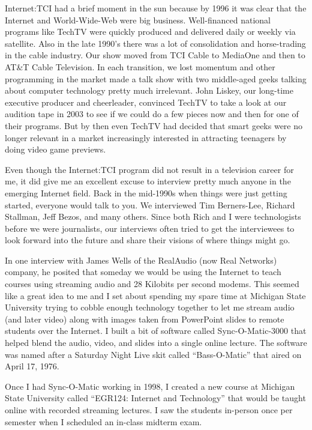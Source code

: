 \documentclass[12pt]{book}
\begin{document}
Internet:TCI had a brief moment in the sun because by 1996 it
was clear that the Internet and World-Wide-Web were big
business.  Well-financed national programs like TechTV were quickly
produced and delivered daily or weekly via satellite.  Also in the late
1990's there was a lot of consolidation and horse-trading in the cable
industry.   Our show moved from TCI Cable to MediaOne and then to
AT\&T Cable Television.  In each transition, we lost momentum
and other programming in the market made a talk show
with two middle-aged geeks talking about computer technology pretty much
irrelevant.  John Liskey, our long-time executive producer and
cheerleader, convinced TechTV to take a look at our audition
tape in 2003 to see if we could do a few pieces now and then
for one of their programs.  But by then even
TechTV had decided that smart geeks
were no longer relevant in a market increasingly interested in
attracting teenagers by doing video game previews.

Even though the Internet:TCI program did not result in a television
career for me, it did give me an excellent excuse to interview
pretty much anyone in the emerging Internet field.   Back in the mid-1990s
when things were just getting started, everyone would talk to you.
We interviewed Tim Berners-Lee, Richard Stallman, Jeff Bezos, and many
others.  Since both Rich and I were technologists before we were
journalists, our interviews often tried to get the interviewees to look
forward into the future and share their visions of where things might go.

In one interview with James Wells of the RealAudio (now Real Networks)
company, he posited that someday we would be using the Internet to
teach courses using streaming audio and 28 Kilobits per second modems.
This seemed like a great idea to me and I set about spending my spare
time at Michigan State University trying to cobble enough technology
together to let me stream audio (and later video) along with images taken
from PowerPoint slides to remote students over the Internet.  I built
a bit of software called Sync-O-Matic-3000 that helped
blend the audio, video, and slides into a single online lecture.
The software was named after a Saturday Night Live skit called
``Bass-O-Matic'' that aired on April 17, 1976.

Once I had Sync-O-Matic working in 1998, I created a new course at
Michigan State University called ``EGR124: Internet and Technology''
that would be taught online with recorded streaming lectures.
I saw the students in-person once per semester when I scheduled
an in-class midterm exam.
\end{document}
